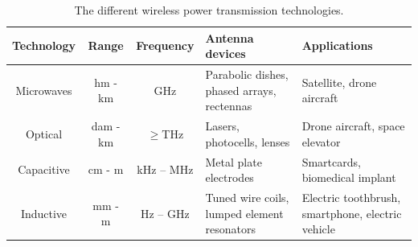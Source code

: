\begin{table}[htbp]
    \centering
    \caption{The different wireless power transmission technologies.}
    \begin{tabular}{ |c|c|c|m{3.5cm}<{\centering}|m{3.5cm}<{\centering}| }
        \hline
        \textbf{Technology} & \textbf{Range} & \textbf{Frequency}         & \textbf{Antenna devices}                    & \textbf{Applications}                             \\\hline
Microwaves          & hm - km        & GHz                        & Parabolic dishes, phased arrays, rectennas  & Satellite, drone aircraft                         \\ \hline
Optical             & dam - km
                    & $\geq$THz      & Lasers, photocells, lenses & Drone aircraft, space elevator                                                                  \\ \hline
Capacitive          & cm - m         & kHz – MHz                  & Metal plate electrodes                      & Smartcards, biomedical implant
\\ \hline
Inductive           & mm - m         & Hz – GHz                   & Tuned wire coils, lumped element resonators & Electric toothbrush, smartphone, electric vehicle
\\ \hline
    \end{tabular}
    \label{table:differentWPT}
\end{table}



